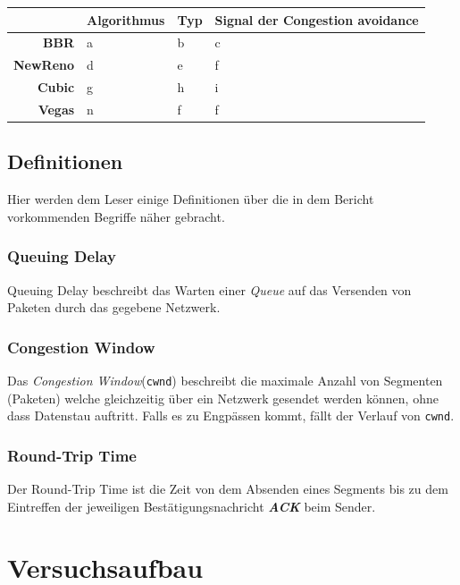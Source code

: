 \documentclass[paper=a4,fontsize=12pt,ngerman]{scrartcl}
\begin{document}
\begin{table}[ht]
\centering

\begin{tabular}{r|l|l|l}
   & \textbf{Algorithmus} & \textbf{Typ} & \textbf{Signal der Congestion avoidance} \\ \hline
\textbf{BBR} & a & b & c \\
\textbf{NewReno} & d & e & f \\
\textbf{Cubic} & g & h & i \\
\textbf{Vegas} & n & f & f 

\end{tabular}
\end{table}

\subsection{Definitionen}
Hier werden dem Leser einige Definitionen über die in dem Bericht vorkommenden Begriffe näher gebracht.

\subsubsection{Queuing Delay}
Queuing Delay beschreibt das Warten einer \textit{Queue}
auf das Versenden von Paketen durch das gegebene Netzwerk.


\subsubsection{Congestion Window}
Das \textit{Congestion Window}(\texttt{cwnd}) beschreibt die maximale Anzahl von Segmenten (Paketen) welche gleichzeitig über ein Netzwerk gesendet werden können, ohne 
dass Datenstau auftritt. Falls es zu Engpässen kommt, fällt der Verlauf von \texttt{cwnd}.

\subsubsection{Round-Trip Time}

Der Round-Trip Time ist die Zeit von dem Absenden eines Segments bis zu dem Eintreffen der jeweiligen Bestätigungsnachricht \textit{\textbf{ACK}} beim Sender.



\clearpage
\section{Versuchsaufbau}
\end{document}

